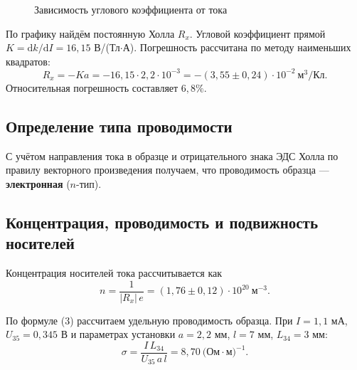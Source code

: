 \documentclass[a4paper,12pt]{article}
\begin{document}
\begin{figure}[H]
    \centering
    \caption{Зависимость углового коэффициента от тока}
    \label{fig:k}
\end{figure}

По графику найдём постоянную Холла $R_x$. Угловой коэффициент прямой $K = \mathrm{d}k/\mathrm{d}I = 16{,}15$ В/(Тл$\cdot$А). Погрешность рассчитана по методу наименьших квадратов:
\begin{equation}
    R_x = -K a = -16{,}15 \cdot 2{,}2\cdot 10^{-3}
        = -(3{,}55 \pm 0{,}24)\cdot 10^{-2}\ \text{м}^3/\text{Кл}.
\end{equation}
Относительная погрешность составляет $6{,}8\%$.

\subsection{Определение типа проводимости}
С учётом направления тока в образце и отрицательного знака ЭДС Холла по правилу векторного произведения получаем, что проводимость образца — \textbf{электронная} ($n$-тип).

\subsection{Концентрация, проводимость и подвижность носителей}
Концентрация носителей тока рассчитывается как
\begin{equation}
    n = \frac{1}{|R_x|\,e} = (1{,}76 \pm 0{,}12)\cdot 10^{20}\ \text{м}^{-3}.
\end{equation}

По формуле (3) рассчитаем удельную проводимость образца. При $I = 1{,}1$ мА, $U_{35} = 0{,}345$ В и параметрах установки $a = 2{,}2$ мм, $l = 7$ мм, $L_{34} = 3$ мм:
\begin{equation}
    \sigma = \frac{I\,L_{34}}{U_{35}\,a\,l}
           = 8{,}70\ \text{(Ом}\cdot\text{м)}^{-1}.
\end{equation}
\end{document}
